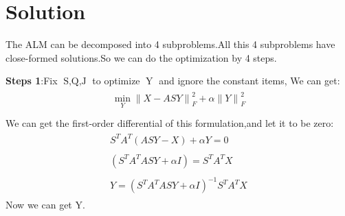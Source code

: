 \documentclass{article}
\begin{document}
\section{Solution}
The ALM can be decomposed into 4 subproblems.All this 4 subproblems have close-formed solutions.So we can do the optimization by 4 steps.\\

\begin{flushleft}
\textbf{Steps 1}:\;\;Fix $\mathop{S,Q,J}$ to optimize $\mathop{Y}$ and ignore the constant items, We can get:
\begin{eqnarray}
\begin{array}{l}
    \mathop{\min}\limits_{Y} {\parallel X - ASY\parallel}_F^2 + \alpha{\parallel Y\parallel}_F^2\\
\end{array}
\end{eqnarray}
We can get the first-order differential of this formulation,and let it to be zero:
\begin{eqnarray}
\begin{array}{lll}
    S^TA^T(ASY-X) +\alpha Y = 0 \nonumber \\\\
    (S^TA^TASY+\alpha I) = S^TA^TX \nonumber \\\\
    Y = (S^TA^TASY+\alpha I)^{-1}S^TA^TX \nonumber
\end{array}
\end{eqnarray}
Now we can get Y.\\
\end{flushleft}
\end{document}
